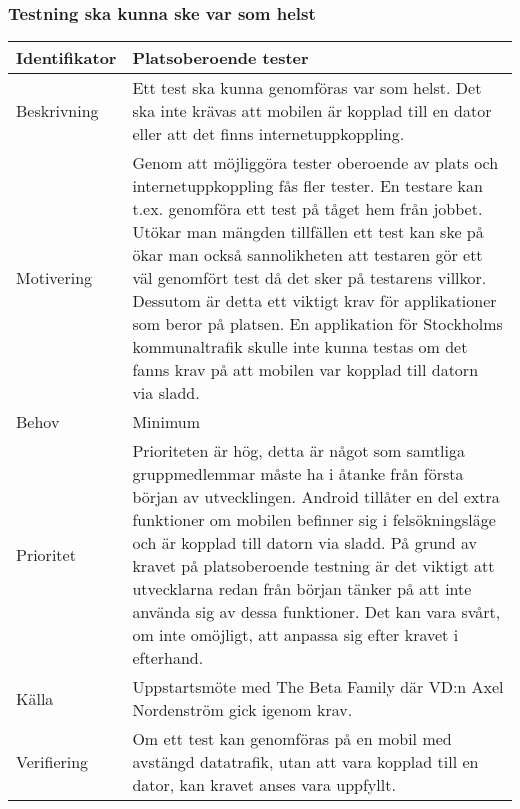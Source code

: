 \subsubsection{Testning ska kunna ske var som helst}
\begin{tabular}{ | p{65pt} | p{300pt} |}
  \hline
  Identifikator & 
  Platsoberoende tester
  \\ \hline
  Beskrivning & 
  Ett test ska kunna genomföras var som helst. Det ska inte krävas att mobilen är kopplad till en dator eller att det finns internetuppkoppling.
  \\ \hline
  Motivering &
  Genom att möjliggöra tester oberoende av plats och internetuppkoppling fås fler tester. En testare kan t.ex. genomföra ett test på tåget hem från jobbet. Utökar man mängden tillfällen ett test kan ske på ökar man också sannolikheten att testaren gör ett väl genomfört test då det sker på testarens villkor. Dessutom är detta ett viktigt krav för applikationer som beror på platsen. En applikation för Stockholms kommunaltrafik skulle inte kunna testas om det fanns krav på att mobilen var kopplad till datorn via sladd.
  \\ \hline
  Behov &
Minimum
  \\ \hline
  Prioritet &
Prioriteten är hög, detta är något som samtliga gruppmedlemmar måste ha i åtanke från första början av utvecklingen. Android tillåter en del extra funktioner om mobilen befinner sig i felsökningsläge och är kopplad till datorn via sladd. På grund av kravet på platsoberoende testning är det viktigt att utvecklarna redan från början tänker på att inte använda sig av dessa funktioner. Det kan vara svårt, om inte omöjligt, att anpassa sig efter kravet i efterhand.
  \\ \hline
  Källa &
 Uppstartsmöte med The Beta Family där VD:n Axel Nordenström gick igenom krav.
  \\ \hline
  Verifiering &
  Om ett test kan genomföras på en mobil med avstängd datatrafik, utan att vara kopplad till en dator, kan kravet anses vara uppfyllt.
  \\ \hline
\end{tabular}

